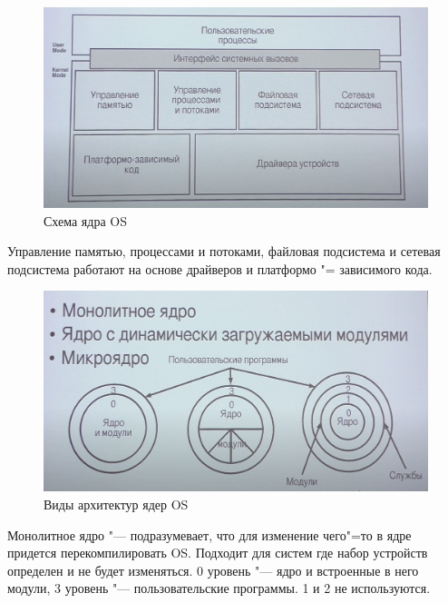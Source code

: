 \documentclass[bachelor, och, book]{SCWorks}
\theoremstyle{remark}
\begin{document}
    \begin{figure}[H]
        \begin{center}
            \includegraphics[scale=0.4]{res/OS-kernel-diagram.png}
            \caption{Схема ядра OS}
        \end{center}
    \end{figure}

    Управление памятью, процессами и потоками, файловая подсистема и сетевая подсистема работают на основе драйверов и платформо "= зависимого кода.

    \begin{figure}[H]
        \begin{center}
            \includegraphics[scale=0.4]{res/kernel-architectures.png}
            \caption{Виды архитектур ядер OS}
        \end{center}
    \end{figure}

    Монолитное ядро "--- подразумевает, что для изменение чего"=то в ядре придется перекомпилировать OS. Подходит для систем где набор устройств определен и не будет изменяться. 0 уровень "--- ядро и встроенные в него модули, 3 уровень "--- пользовательские программы. 1 и 2 не используются.
\end{document}

